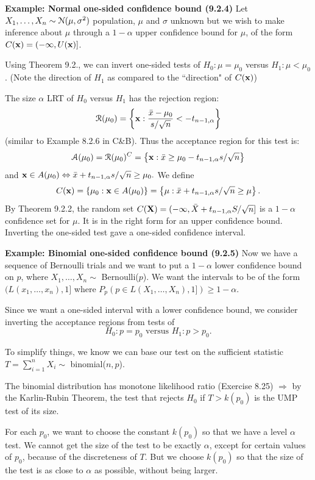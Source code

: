 \documentclass[11pt,]{article}
\newcommand{\Xndots}{X_1, \ldots, X_n}
\def\bx{{\bf x}}
\def\bX{{\bf X}}
\def\xbar{\bar{ x}}
\def\Xbar{\bar{ X}}
\def\Asc{{\cal A}}
\def\Nsc{{\cal N}}
\def\Rsc{{\cal R}}
\def\sumin{\sum_{i=1}^n}
\begin{document}
\textbf{Example: Normal one-sided confidence bound (9.2.4)} Let
\(\Xndots \sim \Nsc(\mu,\sigma^2)\) population, \(\mu\) and \(\sigma\)
unknown but we wish to make inference about \(\mu\) through a
\(1-\alpha\) upper confidence bound for \(\mu\), of the form
\(C(\bx) = (-\infty, U(\bx)]\).

Using Theorem 9.2., we can invert one-sided tests of
\(H_0: \mu = \mu_0\) versus \(H_1: \mu < \mu_0\). (Note the direction of
\(H_1\) as compared to the ``direction" of \(C(\bx)\))

The size \(\alpha\) LRT of \(H_0\) versus \(H_1\) has the rejection
region:
\[\Rsc(\mu_0) =\left\{\bx: \frac{\xbar - \mu_0}{s/\sqrt{n}} < -t_{n-1, \alpha}\right\}\]
(similar to Example 8.2.6 in C\&B). Thus the acceptance region for this
test is:
\[\Asc(\mu_0) = \Rsc(\mu_0)^C = \left\{\bx: \xbar \geq \mu_0 - t_{n-1,\alpha} s/\sqrt{n}\right\}\]
and
\(\bx \in A(\mu_0) \Leftrightarrow \xbar + t_{n-1,\alpha} s/\sqrt{n} \geq \mu_0.\)
We define
\[C(\bx) = \{\mu_0 : \bx \in A(\mu_0)\} = \left\{ \mu: \xbar + t_{n-1,\alpha} s/\sqrt{n} \geq \mu \right\}.\]
By Theorem 9.2.2, the random set
\(C(\bX) = (-\infty, \Xbar + t_{n-1,\alpha}S/\sqrt{n}]\) is a
\(1-\alpha\) confidence set for \(\mu\). It is in the right form for an
upper confidence bound. Inverting the one-sided test gave a one-sided
confidence interval.

\noindent\textbf{Example: Binomial one-sided confidence bound (9.2.5)}
Now we have a sequence of Bernoulli trials and we want to put a
\(1-\alpha\) lower confidence bound on \(p\), where \(\Xndots \sim\)
Bernoulli(\(p\)). We want the intervals to be of the form
\((L(x_1, \ldots, x_n), 1]\) where
\(P_p(p \in L(\Xndots),1]) \geq 1-\alpha\).

Since we want a one-sided interval with a lower confidence bound, we
consider inverting the acceptance regions from tests of
\[H_0: p = p_0 \mbox{ versus } H_1: p > p_0.\]

To simplify things, we know we can base our test on the sufficient
statistic \(T = \sumin X_i \sim\) binomial(\(n,p\)).

The binomial distribution has monotone likelihood ratio (Exercise 8.25)
\(\Rightarrow\) by the Karlin-Rubin Theorem, the test that rejects
\(H_0\) if \(T > k(p_0)\) is the UMP test of its size.

For each \(p_0\), we want to choose the constant \(k(p_0)\) so that we
have a level \(\alpha\) test. We cannot get the size of the test to be
exactly \(\alpha\), except for certain values of \(p_0\), because of the
discreteness of \(T\). But we choose \(k(p_0)\) so that the size of the
test is as close to \(\alpha\) as possible, without being larger.
\end{document}
